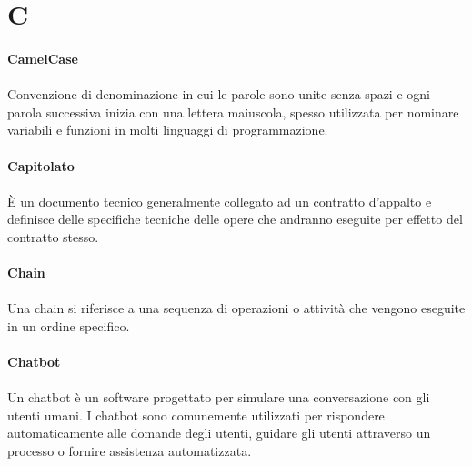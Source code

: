 \documentclass[10pt, a4paper]{article}
\begin{document}
\newpage
\section{C}

\vspace{2em}
\paragraph{CamelCase}\noindent\hrulefill
\paragraph{}Convenzione di denominazione in cui le parole sono unite senza spazi e ogni parola successiva inizia con una lettera maiuscola, spesso utilizzata per nominare variabili e funzioni in molti linguaggi di programmazione.


\vspace{2em}
\paragraph{Capitolato}\noindent\hrulefill\noindent\hrulefill
\paragraph{} È un documento tecnico generalmente collegato ad un contratto d'appalto e definisce delle specifiche tecniche delle opere che andranno eseguite per effetto del contratto stesso.

\vspace{2em}
\paragraph{Chain}\noindent\hrulefill
\paragraph{}Una chain si riferisce a una sequenza di operazioni o attività che vengono eseguite in un ordine specifico.

\vspace{2em}
\paragraph{Chatbot}\noindent\hrulefill
\paragraph{}Un chatbot è un software progettato per simulare una conversazione con gli utenti umani. I chatbot sono comunemente utilizzati per rispondere automaticamente alle domande degli utenti, guidare gli utenti attraverso un processo o fornire assistenza automatizzata.
\end{document}
